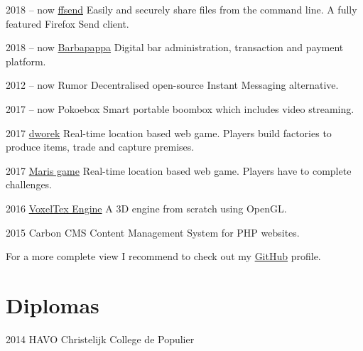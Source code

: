 \documentclass[]{friggeri-cv}
\begin{document}
\begin{entrylist}

\entry
{2018 -- now}
{\href{https://github.com/timvisee/ffsend}{ffsend}}
{}
{Easily and securely share files from the command line. A fully featured Firefox Send client.}

\entry
{2018 -- now}
{\href{https://github.com/timvisee/barbapappa}{Barbapappa}}
{}
{Digital bar administration, transaction and payment platform.}

\entry
{2012 -- now}
{Rumor}
{}
{Decentralised open-source Instant Messaging alternative.}

\entry
{2017 -- now}
{Pokoebox}
{}
{Smart portable boombox which includes video streaming.}

\entry
{2017}
{\href{https://github.com/timvisee/dworek}{dworek}}
{}
{Real-time location based web game. Players build factories to produce items,
trade and capture premises.}

\entry
{2017}
{\href{https://github.com/timvisee/maris-game}{Maris game}}
{}
{Real-time location based web game. Players have to complete challenges.}

\entry
{2016}
{\href{https://github.com/timvisee/voxeltex-engine}{VoxelTex Engine}}
{}
{A 3D engine from scratch using OpenGL.}

\entry
{2015}
{Carbon CMS}
{}
{Content Management System for PHP websites.}

\end{entrylist}

For a more complete view I recommend to check out my
\href{https://github.com/timvisee}{GitHub}
profile.


\section{Diplomas}

\begin{entrylist}


\entry
{2014}
{HAVO}
{Christelijk College de Populier}


\end{entrylist}
\end{document}
